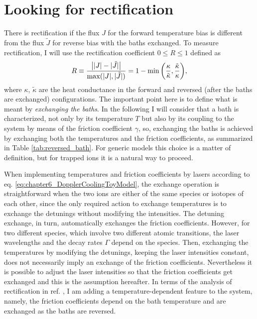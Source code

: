 \section{Looking for rectification\label{sec:lookingForR}}
%
%
There is rectification if the flux $J$  for the forward temperature bias is different from the flux $\tilde{J}$ for reverse bias
with the baths exchanged.  To measure rectification, I will use the rectification coefficient $0\le R\le 1$ defined as
%
\begin{equation}
  R \equiv \frac{\abs{|J|-|\tilde{J}|}}{\max(|J|,|\tilde{J}|)}
  = 1 - \min{ \left( \frac{\kappa}{\tilde{\kappa}} , \frac{\tilde{\kappa}}{\kappa} \right) },
  \label{eq:chapter6_Rectification}
\end{equation}
%
where $\kappa$, $\tilde{\kappa}$ are the heat conductance in the forward and reversed (after the baths are exchanged) configurations. The important point here is to define what is meant by \textit{exchanging the baths}. In the following I will consider that a bath is characterized, not only by its temperature $T$ but also by its coupling  to the system by means of the friction coefficient $\gamma$, so, exchanging the baths is achieved by exchanging both the temperatures and the friction coefficients, as summarized in Table \ref{tab:reversed_bath}. For generic models this
choice is a matter of definition, but for trapped ions it is a natural way to proceed.

When implementing temperatures and friction coefficients by lasers according to
eq. \eqref{eq:chapter6_DopplerCoolingToyModel}, the exchange operation is straightforward when the two ions are either of the same species or isotopes of each other, since the only required action to exchange temperatures is to exchange the detunings without modifying the intensities. The detuning exchange, in turn, automatically exchanges the friction coefficients. However, for two different species, which involve two different atomic transitions, the laser wavelengths and the decay rates $\Gamma$ depend on the species. Then, exchanging the temperatures by modifying the detunings, keeping the laser intensities constant, does not necessarily imply an exchange of the friction coefficients. Nevertheless it is possible to adjust the laser intensities so that the friction coefficients get exchanged and this is the assumption hereafter. In terms of the analysis of rectification in ref. \cite{Pereira2017}, I am adding a temperature-dependent feature to the system, namely,  the friction coefficients depend on the bath temperature and are exchanged as the baths are reversed.

